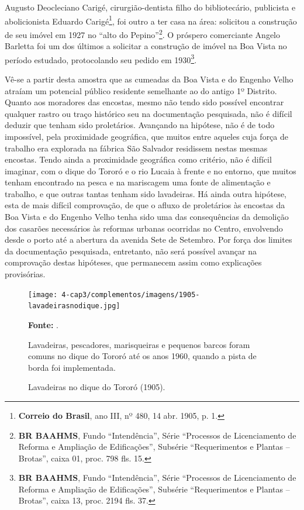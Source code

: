 Augusto Deocleciano Carigé, cirurgião-dentista filho do bibliotecário, publicista e abolicionista Eduardo Carigé\footnote{\textbf{Correio do Brasil}, ano III, nº 480, 14 abr. 1905, p. 1.}, foi outro a ter casa na área: solicitou a construção de seu imóvel em 1927 no ``alto do Pepino''\footnote{\textbf{BR BAAHMS}, Fundo ``Intendência'', Série ``Processos de Licenciamento de Reforma e Ampliação de Edificações'', Subsérie ``Requerimentos e Plantas -- Brotas'', caixa 01, proc. 798 fls. 15.}. O próspero comerciante Angelo Barletta foi um dos últimos a solicitar a construção de imóvel na Boa Vista no período estudado, protocolando seu pedido em 1930\footnote{\textbf{BR BAAHMS}, Fundo ``Intendência'', Série ``Processos de Licenciamento de Reforma e Ampliação de Edificações'', Subsérie ``Requerimentos e Plantas -- Brotas'', caixa 13, proc. 2194 fls. 37.}.

Vê-se a partir desta amostra que as cumeadas da Boa Vista e do Engenho Velho atraíam um potencial público residente semelhante ao do antigo 1º Distrito. Quanto aos moradores das encostas, mesmo não tendo sido possível encontrar qualquer rastro ou traço histórico seu na documentação pesquisada, não é difícil deduzir que tenham sido proletários. Avançando na hipótese, não é de todo impossível, pela proximidade geográfica, que muitos entre aqueles cuja força de trabalho era explorada na fábrica São Salvador residissem nestas mesmas encostas. Tendo ainda a proximidade geográfica como critério, não é difícil imaginar, com o dique do Tororó e o rio Lucaia à frente e no entorno, que muitos tenham encontrado na pesca e na mariscagem uma fonte de alimentação e trabalho, e que outras tantas tenham sido lavadeiras. Há ainda outra hipótese, esta de mais difícil comprovação, de que o afluxo de proletários às encostas da Boa Vista e do Engenho Velho tenha sido uma das consequências da demolição dos casarões necessários às reformas urbanas ocorridas no Centro, envolvendo desde o porto até a abertura da avenida Sete de Setembro. Por força dos limites da documentação pesquisada, entretanto, não será possível avançar na comprovação destas hipóteses, que permanecem assim como explicações provisórias.

\begin{figure}[!h]
\centering
\caption{Lavadeiras no dique do Tororó (1905).}
\texttt{[image: 4-cap3/complementos/imagens/1905-lavadeirasnodique.jpg]}{\footnotesize \par \textbf{Fonte:} . \par Lavadeiras, pescadores, marisqueiras e pequenos barcos foram comuns no dique do Tororó até os anos 1960, quando a pista de borda foi implementada.}
\label{fig:1905-lavadeirasnodique}
\end{figure}

